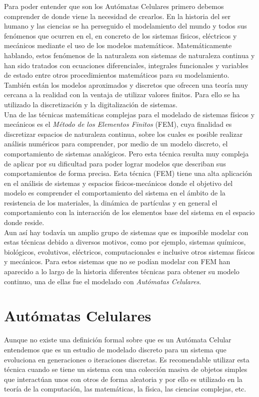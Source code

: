 %

Para poder entender que son los Autómatas Celulares primero debemos comprender de donde viene la necesidad de crearlos. En la historia del ser humano y las ciencias se ha perseguido el modelamiento del mundo y todos sus fenómenos que ocurren en el, en concreto de los sistemas físicos, eléctricos y mecánicos mediante el uso de los modelos matemáticos. Matemáticamente hablando, estos fenómenos de la naturaleza son sistemas de naturaleza continua y han sido tratados con ecuaciones diferenciales, integrales funcionales y variables de estado entre otros procedimientos matemáticos para su modelamiento. También están los modelos aproximados y discretos que ofrecen una teoría muy cercana a la realidad con la ventaja de utilizar valores finitos. Para ello se ha utilizado la discretización y la digitalización de sistemas.\\

Una de las técnicas matemáticas complejas para el modelado de sistemas físicos y mecánicos es el \textit{Método de los Elementos Finitos} (FEM), cuya finalidad es discretizar espacios de naturaleza continua, sobre los cuales es posible realizar análisis numéricos para comprender, por medio de un modelo discreto, el comportamiento de sistemas analógicos. Pero esta técnica resulta muy compleja de aplicar por su dificultad para poder lograr modelos que describan sus comportamientos de forma precisa. Esta técnica (FEM) tiene una alta aplicación en el análisis de sistemas y espacios físicos-mecánicos donde el objetivo del modelo es comprender el comportamiento del sistema en el ámbito de la resistencia de los materiales, la dinámica de partículas y en general el comportamiento con la interacción  de los elementos base del sistema en el espacio donde reside.\\

Aun así hay todavía un amplio grupo de sistemas que es imposible modelar con estas técnicas debido a diversos motivos, como por ejemplo, sistemas químicos, biológicos, evolutivos, eléctricos, computacionales e inclusive otros sistemas físicos y mecánicos. Para estos sistemas que no se podían modelar con FEM han aparecido a lo largo de la historia diferentes técnicas para obtener su modelo continuo, una de ellas fue el modelado con \textit{Autómatas Celulares}.




\section{Autómatas Celulares}
Aunque no existe una definición formal sobre que es un Autómata Celular entendemos que es un estudio de modelado discreto para un sistema que evoluciona en generaciones o iteraciones discretas. Es recomendable utilizar esta técnica cuando se tiene un sistema con una colección masiva de objetos simples que interactúan unos con otros de forma aleatoria y por ello es utilizado en la teoría de la computación, las matemáticas, la física, las ciencias complejas, etc. \\

